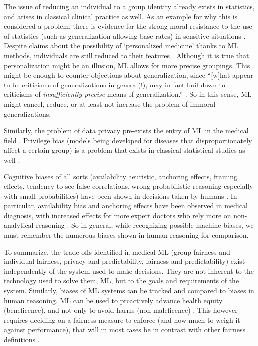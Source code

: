     The issue of reducing an individual to a group identity already exists in statistics, and arises in classical clinical practice as well.
    As an example for why this is considered a problem, there is evidence for the strong moral resistance to the use of statistics (such as generalization-allowing base rates) in sensitive situations \cite{Tetlock2003}.
    Despite claims about the possibility of `personalized medicine' thanks to ML methods, individuals are still reduced to their features \cite{Dijkstra2020, Binns2018}.
    Although it is true that personalization might be an illusion, ML allows for more precise groupings.
    This might be enough to counter objections about generalization, since ``[w]hat appear to be criticisms of generalizations in general(!), may in fact boil down to criticisms of \emph{insufficiently precise} means of generalization.'' \cite[p.~5]{Binns2018}.
    So in this sense, ML might cancel, reduce, or at least not increase the problem of immoral generalizations.

    Similarly, the problem of data privacy pre-exists the entry of ML in the medical field \cite{Dijkstra2020}.
    Privilege bias (models being developed for diseases that disproportionately affect a certain group\cite{Rajkomar2018}) is a problem that exists in classical statistical studies as well \cite{Jackson2019}.

    Cognitive biases of all sorts (availability heuristic, anchoring effects, framing effects, tendency to see false correlations, wrong probabilistic reasoning especially with small probabilities) have been shown in decisions taken by humans \cite{Zerilli2019}.
    In particular, availability bias and anchoring effects have been observed in medical diagnosis, with increased effects for more expert doctors who rely more on non-analytical reasoning \cite{Mamede2010}.
    So in general, while recognizing possible machine biases, we must remember the numerous biases shown in human reasoning for comparison.

    To summarize, the trade-offs identified in medical ML (group fairness and individual fairness, privacy and predictability, fairness and predictability) exist independently of the system used to make decisions.
    They are not inherent to the technology used to solve them, ML, but to the goals and requirements of the system.
    Similarly, biases of ML systems can be tracked and compared to biases in human reasoning.
    ML can be used to proactively advance health equity (beneficence), and not only to avoid harms (non-maleficence) \cite{Rajkomar2018, Mccradden2020}.
    This however requires deciding on a fairness measure to enforce (and how much to weigh it against performance), that will in most cases be in contrast with other fairness definitions \cite{Zerilli2019}.



